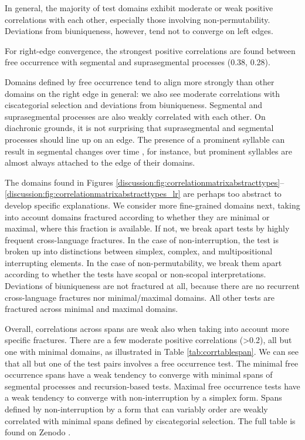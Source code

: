 \documentclass[output=paper,draftmode]{langscibook}
\begin{document}
In general, the majority of test domains exhibit moderate or weak positive correlations with each other, especially those involving non-permutability. Deviations from biuniqueness, however, tend not to converge on left edges.

For right-edge convergence, the strongest positive correlations are found between free occurrence with segmental and suprasegmental processes (0.38, 0.28). 

Domains defined by free occurrence tend to align more strongly than other domains on the right edge in general: we also see moderate correlations with ciscategorial selection and deviations from biuniqueness. Segmental and suprasegmental processes are also weakly correlated with each other.
On diachronic grounds, it is not surprising that suprasegmental and segmental processes should line up on an edge. The presence of a prominent syllable can result in segmental changes over time \citep{bybee1998prosody}, for instance, but prominent syllables are almost always attached to the edge of their domains.

The domains found in Figures \ref{discussion:fig:correlationmatrixabstracttypes}--\ref{discussion:fig:correlationmatrixabstracttypes_lr} are perhaps too abstract to develop specific explanations. 
We consider more fine-grained domains next, taking into account domains fractured according to whether they are minimal or maximal, where this fraction is available. If not, we break apart tests by highly frequent cross-language fractures. In the case of non-interruption, the test is broken up into distinctions between simplex, complex, and multipositional interrupting elements. In the case of non-permutability, we break them apart according to whether the tests have scopal or non-scopal interpretations. 
Deviations of biuniqueness are not fractured at all, because there are no recurrent cross-language fractures nor minimal/maximal domains. All other tests are fractured across minimal and maximal domains.

Overall, correlations across spans are weak also when taking into account more specific fractures. There are a few moderate positive correlations (\textgreater{}0.2), all but one with minimal domains, as illustrated in Table \ref{tab:corrtablespan}. We can see that all but one of the test pairs involves a free occurrence test. The minimal free occurrence spans have a weak tendency to converge with minimal spans of segmental processes and recursion-based tests. Maximal free occurrence tests have a weak tendency to converge with non-interruption by a simplex form.
Spans defined by non-interruption by a form that can variably order are weakly correlated with minimal spans defined by ciscategorial selection.
The full table is found on Zenodo \citep{auderset2023constituency}.
\end{document}
